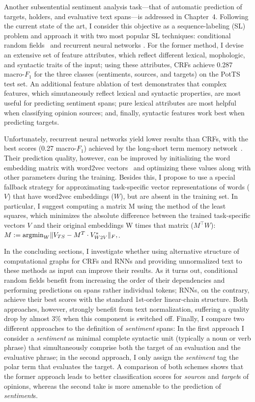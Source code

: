 \documentclass[11pt]{article}
\newcommand{\F}[0]{$F_1$}
\newcommand{\argmin}{\operatornamewithlimits{argmin}}
\renewcommand{\cite}{\citep}
\begin{document}
Another subsentential sentiment analysis task---that of automatic
prediction of targets, holders, and evaluative text spans---is
addressed in Chapter~4.  Following the current state of the art, I
consider this objective as a sequence-labeling (SL) problem and
approach it with two most popular SL techniques: conditional random
fields~\cite[CRFs; ][]{Lafferty:01} and recurrent neural networks
\cite[RNNs; ][]{Hochreiter:97,Cho:14a}.  For the former method, I
devise an extensive set of feature attributes, which reflect different
lexical, mophologic, and syntactic traits of the input; using these
attributes, CRFs achieve 0.287 macro-\F{} for the three classes
(sentiments, sources, and targets) on the PotTS test set.  An
additional feature ablation of test demonstrates that complex
features, which simutaneously reflect lexical and syntactic
properties, are most useful for predicting sentiment spans; pure
lexical attributes are most helpful when classifying opinion sources;
and, finally, syntactic features work best when predicting targets.

Unfortunately, recurrent neural networks yield lower results than
CRFs, with the best scores (0.27 macro-\F{}) achieved by the
long-short term memory network~\cite{Hochreiter:97}.  Their prediction
quality, however, can be improved by initializing the word embedding
matrix with word2vec vectors~\cite{Mikolov:13} and optimizing these
values along with other parameters during the training.  Besides this,
I propose to use a special fallback strategy for approximating
task-specific vector representations of words ($V$) that have word2vec
embeddings ($W$), but are absent in the training set.  In particular,
I suggest computing a matrix M using the method of the least squares,
which minimizes the absolute difference between the trained
task-specific vectors $V$ and their original embeddings W times that
matrix ($M^{\top}W$): $M := \argmin_{W}\lVert V_{TS} - M^T\cdot
V^*_{W2V}\rVert_F,$.

In the concluding sections, I investigate whether using alternative
structure of computational graphs for CRFs and RNNs and providing
unnormalized text to these methods as input can improve their results.
As it turns out, conditional random fields benefit from increasing the
order of their dependencies and performing predictions on spans rather
individual tokens; RNNs, on the contrary, achieve their best scores
with the standard 1st-order linear-chain structure.  Both approaches,
however, strongly benefit from text normalization, suffering a quality
drop by almost 3\% when this component is switched off.  Finally, I
compare two different approaches to the definition of \emph{sentiment}
spans: In the first approach I consider a \emph{sentiment} as minimal
complete syntactic unit (typically a noun or verb phrase) that
simultaneously comprise both the target of an evaluation and the
evaluative phrase; in the second approach, I only assign the
\emph{sentiment} tag the polar term that evaluates the target.  A
comparison of both schemes shows that the former approach leads to
better classification scores for \emph{source}s and \emph{target}s of
opinions, whereas the second take is more amenable to the prediction
of \emph{sentiment}s.
\end{document}
